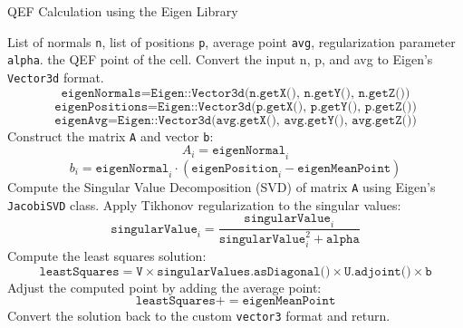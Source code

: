 \vspace{2mm}
\begin{algorithm}[H]
\caption{QEF Calculation using the Eigen Library}
\label{alg:qef_calc}
\begin{algorithmic} [1]
\vspace{2.5mm}
\Require List of normals \texttt{n}, list of positions \texttt{p}, average point \texttt{avg}, regularization parameter \texttt{alpha}.
\vspace{2mm}
\Ensure the QEF point of the cell.
\vspace{2.5mm}
\State Convert the input n, p, and avg to Eigen's \texttt{Vector3d} format.
\begin{equation} \label{eq:4.1}
    \texttt{eigenNormals} = \texttt{Eigen::Vector3d(n.getX(), n.getY(), n.getZ())}
\end{equation}
\begin{equation} \label{eq:4.2}
    \texttt{eigenPositions} = \texttt{Eigen::Vector3d(p.getX(), p.getY(), p.getZ())}
\end{equation}
\begin{equation} \label{eq:4.3}
    \texttt{eigenAvg} = \texttt{Eigen::Vector3d(avg.getX(), avg.getY(), avg.getZ())}
\end{equation}
\hfill
\State Construct the matrix \texttt{A} and vector \texttt{b}:
\begin{equation} \label{eq:3.2}
    A_{i} = \texttt{eigenNormal}_{i}
\end{equation}
\begin{equation} \label{eq:3.3}
    b_{i} = \texttt{eigenNormal}_{i} \cdot (\texttt{eigenPosition}_{i} - \texttt{eigenMeanPoint})
\end{equation}
\hfill
\State Compute the Singular Value Decomposition (SVD) of matrix \texttt{A} using Eigen's \texttt{JacobiSVD} class.
\State Apply Tikhonov regularization to the singular values:
\begin{equation} \label{eq:3.4}
    \texttt{singularValue}_{i} = \frac{\texttt{singularValue}_{i}}{\texttt{singularValue}_{i}^2 + \texttt{alpha}}
\end{equation}
\hfill
\State Compute the least squares solution:
\begin{equation} \label{eq:3.5}
    \texttt{leastSquares} = \texttt{V} \times \texttt{singularValues.asDiagonal()} \times \texttt{U.adjoint()} \times \texttt{b}
\end{equation}
\hfill
\State Adjust the computed point by adding the average point:
\begin{equation} \label{eq:3.6}
    \texttt{leastSquares} += \texttt{eigenMeanPoint}
\end{equation}
\hfill
\State Convert the solution back to the custom \texttt{vector3} format and return.
\vspace{2mm}
\end{algorithmic}
\end{algorithm}

